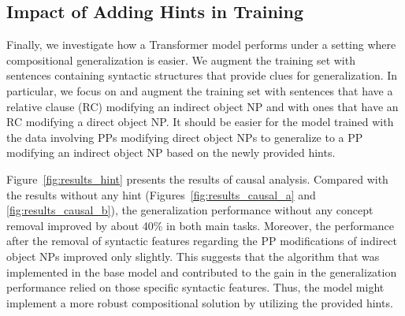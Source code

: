 \subsection{Impact of Adding Hints in Training}

Finally, we investigate how a Transformer model performs under a setting where compositional generalization is easier.
We augment the training set with sentences containing syntactic structures that provide clues for generalization.
In particular, we focus on \dobjppiobjpp{} and augment the training set with sentences that have a relative clause (RC) modifying an indirect object NP and with ones that have an RC modifying a direct object NP.
It should be easier for the model trained with the data involving PPs modifying direct object NPs to generalize to a PP modifying an indirect object NP based on the newly provided hints.

Figure~\ref{fig:results_hint} presents the results of causal analysis.
Compared with the results without any hint (Figures~\ref{fig:results_causal_a} and \ref{fig:results_causal_b}), the generalization performance without any concept removal improved by about 40\% in both main tasks.
Moreover, the performance after the removal of syntactic features regarding the PP modifications of indirect object NPs improved only slightly.
This suggests that the algorithm that was implemented in the base model and contributed to the gain in the generalization performance relied on those specific syntactic features.
Thus, the model might implement a more robust compositional solution by utilizing the provided hints.
